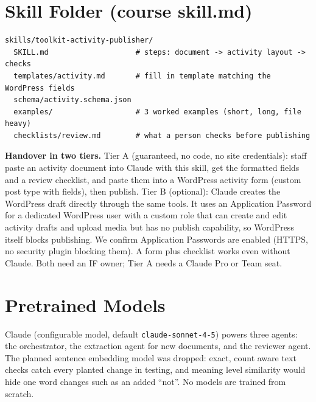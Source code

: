 \section{Skill Folder (course skill.md)}
\begin{lstlisting}
skills/toolkit-activity-publisher/
  SKILL.md                    # steps: document -> activity layout -> checks
  templates/activity.md       # fill in template matching the WordPress fields
  schema/activity.schema.json
  examples/                   # 3 worked examples (short, long, file heavy)
  checklists/review.md        # what a person checks before publishing
\end{lstlisting}
\textbf{Handover in two tiers.} Tier A (guaranteed, no code, no site credentials): staff paste an activity document into Claude with this skill, get the formatted fields and a review checklist, and paste them into a WordPress activity form (custom post type with fields), then publish. Tier B (optional): Claude creates the WordPress draft directly through the same tools. It uses an Application Password for a dedicated WordPress user with a custom role that can create and edit activity drafts and upload media but has no publish capability, so WordPress itself blocks publishing. We confirm Application Passwords are enabled (HTTPS, no security plugin blocking them). A form plus checklist works even without Claude. Both need an IF owner; Tier A needs a Claude Pro or Team seat.

\section{Pretrained Models}
Claude (configurable model, default \texttt{claude-sonnet-4-5}) powers three agents: the orchestrator, the extraction agent for new documents, and the reviewer agent. The planned sentence embedding model was dropped: exact, count aware text checks catch every planted change in testing, and meaning level similarity would hide one word changes such as an added ``not''. No models are trained from scratch.

